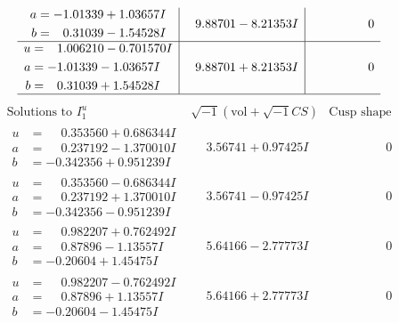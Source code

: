 \documentclass[1p]{elsarticle_modified}
\theoremstyle{definition}
\newcommand{\I}{\sqrt{-1}}
\begin{document}
$$\begin{array}{c|c|c}
\begin{aligned}
a &= -1.01339 + 1.03657 I \\
b &= \phantom{-}0.31039 - 1.54528 I\end{aligned}
 & \phantom{-}9.88701 - 8.21353 I & \phantom{-0.000000 } 0 \\ \hline\begin{aligned}
u &= \phantom{-}1.006210 - 0.701570 I \\
a &= -1.01339 - 1.03657 I \\
b &= \phantom{-}0.31039 + 1.54528 I\end{aligned}
 & \phantom{-}9.88701 + 8.21353 I & \phantom{-0.000000 } 0\\
 \hline 
 \end{array}$$\newpage$$\begin{array}{c|c|c}  
\text{Solutions to }I^u_{1}& \I (\text{vol} + \sqrt{-1}CS) & \text{Cusp shape}\\
 \hline 
\begin{aligned}
u &= \phantom{-}0.353560 + 0.686344 I \\
a &= \phantom{-}0.237192 - 1.370010 I \\
b &= -0.342356 + 0.951239 I\end{aligned}
 & \phantom{-}3.56741 + 0.97425 I & \phantom{-0.000000 } 0 \\ \hline\begin{aligned}
u &= \phantom{-}0.353560 - 0.686344 I \\
a &= \phantom{-}0.237192 + 1.370010 I \\
b &= -0.342356 - 0.951239 I\end{aligned}
 & \phantom{-}3.56741 - 0.97425 I & \phantom{-0.000000 } 0 \\ \hline\begin{aligned}
u &= \phantom{-}0.982207 + 0.762492 I \\
a &= \phantom{-}0.87896 - 1.13557 I \\
b &= -0.20604 + 1.45475 I\end{aligned}
 & \phantom{-}5.64166 - 2.77773 I & \phantom{-0.000000 } 0 \\ \hline\begin{aligned}
u &= \phantom{-}0.982207 - 0.762492 I \\
a &= \phantom{-}0.87896 + 1.13557 I \\
b &= -0.20604 - 1.45475 I\end{aligned}
 & \phantom{-}5.64166 + 2.77773 I & \phantom{-0.000000 } 0 \\ \hline\begin{aligned}

\end{aligned}
\end{array}$$
\end{document}

